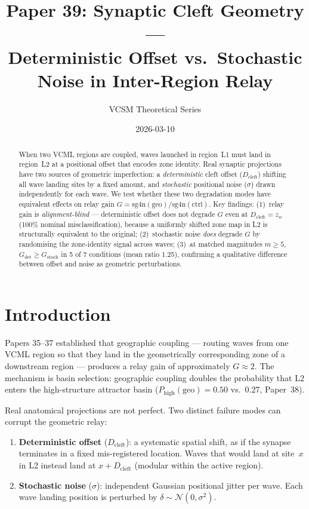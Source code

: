 \documentclass[11pt]{article}
\title{\textbf{Paper 39: Synaptic Cleft Geometry ---\\
Deterministic Offset vs.\ Stochastic Noise in Inter-Region Relay}}
\author{VCSM Theoretical Series}
\date{2026-03-10}
\begin{document}
\maketitle

\begin{abstract}
When two VCML regions are coupled, waves launched in region~L1 must land in
region~L2 at a positional offset that encodes zone identity.
Real synaptic projections have two sources of geometric imperfection:
a \emph{deterministic} cleft offset ($D_\mathrm{cleft}$) shifting all
wave landing sites by a fixed amount, and \emph{stochastic} positional
noise ($\sigma$) drawn independently for each wave.
We test whether these two degradation modes have equivalent effects on
relay gain $G = \mathrm{sg4n}(\mathrm{geo})/\mathrm{sg4n}(\mathrm{ctrl})$.
Key findings: (1)~relay gain is \emph{alignment-blind} --- deterministic
offset does not degrade $G$ even at $D_\mathrm{cleft} = z_w$ (100\%
nominal misclassification), because a uniformly shifted zone map in L2
is structurally equivalent to the original; (2)~stochastic noise
\emph{does} degrade $G$ by randomising the zone-identity signal
across waves; (3)~at matched magnitudes $m \ge 5$, $G_\mathrm{det} \ge
G_\mathrm{stoch}$ in 5 of 7 conditions (mean ratio 1.25), confirming
a qualitative difference between offset and noise as geometric perturbations.
\end{abstract}

\section{Introduction}

Papers 35--37 established that geographic coupling --- routing waves from
one VCML region so that they land in the geometrically corresponding zone
of a downstream region --- produces a relay gain of approximately
$G \approx 2$.
The mechanism is basin selection: geographic coupling doubles the
probability that L2 enters the high-structure attractor basin
($P_\mathrm{high}(\mathrm{geo}) = 0.50$ vs.\ $0.27$, Paper~38).

Real anatomical projections are not perfect.
Two distinct failure modes can corrupt the geometric relay:
\begin{enumerate}
  \item \textbf{Deterministic offset} ($D_\mathrm{cleft}$): a systematic
        spatial shift, as if the synapse terminates in a fixed
        mis-registered location.
        Waves that would land at site~$x$ in L2 instead land at
        $x + D_\mathrm{cleft}$ (modular within the active region).
  \item \textbf{Stochastic noise} ($\sigma$): independent Gaussian
        positional jitter per wave.
        Each wave landing position is perturbed by
        $\delta \sim \mathcal{N}(0, \sigma^2)$.
\end{enumerate}
\end{document}
